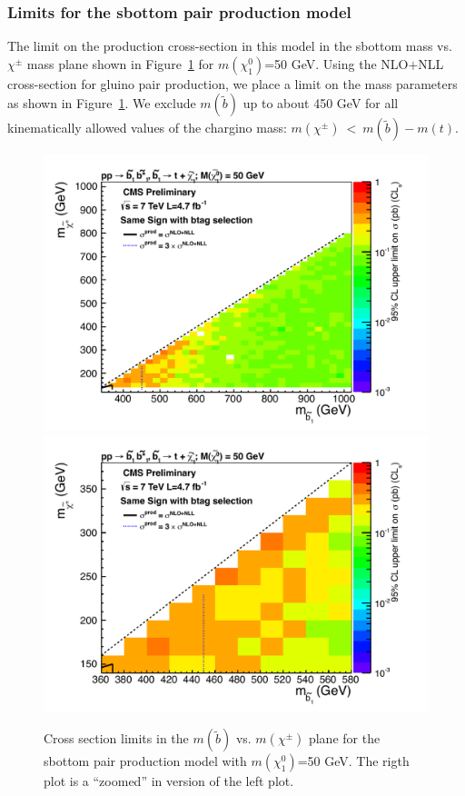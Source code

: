 \subsubsection{Limits for the sbottom pair production model}
\label{sec:sbottompairlimits}
The limit on the production cross-section in this model in the 
sbottom mass vs. $\chi^{\pm}$ mass plane shown in 
Figure~\ref{fig:sbottomLimit} for 
$m(\chi^0_1)$=50 GeV. 
Using the 
NLO$+$NLL cross-section for gluino pair production, we place a limit
on the mass parameters as shown in Figure~\ref{fig:sbottomLimit}.
We exclude $m(\widetilde{b})$ up to about 450 GeV for all
kinematically allowed values of the chargino mass:
$m(\chi^{\pm})~<~m(\widetilde{b})-m(t)$.

\begin{figure}[htb]
\begin{center}
\includegraphics[width=0.48\linewidth]{figs/sbottom_limit.pdf}
\includegraphics[width=0.48\linewidth]{figs/sbottom_limit_zoom.pdf}
\caption{Cross section limits in the $m(\widetilde{b})$ vs. $m(\chi^{\pm})$ 
plane for the sbottom pair production model with 
$m(\chi^0_1)$=50 GeV.  The rigth plot is a ``zoomed'' in version 
of the left plot.\label{fig:sbottomLimit}}
\end{center}
\end{figure}






